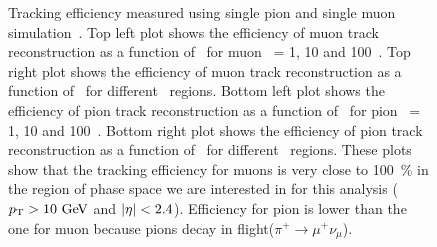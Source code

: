 \begin{figure}[htp]
\begin{tabular}{c}
\end{tabular}
\caption{Tracking efficiency measured using single pion 
and single muon simulation~\cite{TrkPerform}. 
Top left plot shows the efficiency of muon track reconstruction as a function of \Eta\
for muon \pt\ = 1, 10 and 100~\GeV. 
Top right plot shows the efficiency of muon track reconstruction as a function of \pt\
for different \Eta\ regions. 
Bottom left plot shows the efficiency of pion track reconstruction as a function of \Eta\
for pion \pt\ = 1, 10 and 100~\GeV. 
Bottom right plot shows the efficiency of pion track reconstruction as a function of \pt\
for different \Eta\ regions. 
These plots show that the tracking efficiency for muons is very close to 100~\% 
in the region of phase space we are interested in for this analysis
($p_\mathrm{T}>10~\mathrm{Ge\kern -0.1em V}$ and $|\eta|<2.4$). Efficiency for pion is lower than the one for muon 
because pions decay in flight($\pi^+\to\mu^+\nu_\mu$).  
} 
\label{fig:TrackingEffMC} 
\end{figure} 

%





